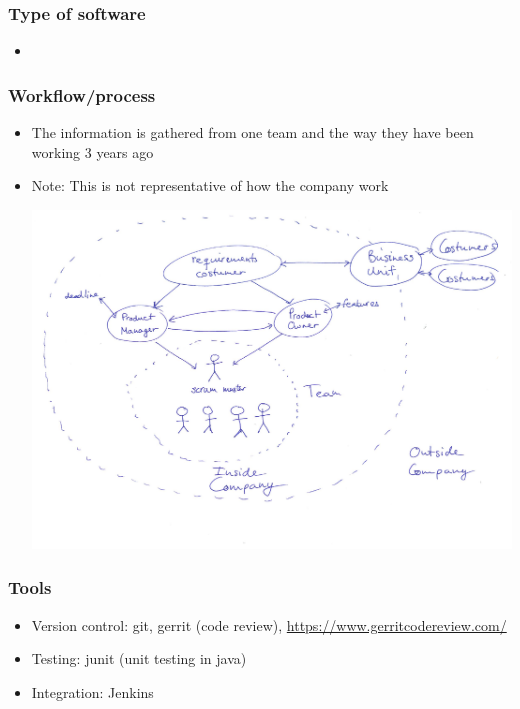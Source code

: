 \documentclass{beamer}
\begin{document}
\begin{frame}
  \frametitle{Type of software}
  \begin{itemize}
  \item
  \end{itemize}
\end{frame}

\begin{frame}
  \frametitle{Workflow/process}
  \begin{itemize}
  \item The information is gathered from one team and the way they have been working 3 years ago 
  \item Note: This is not representative of how the company work 
  \begin{center}
    \includegraphics[width=1\textwidth]{figs/scrum_setup.pdf}
  \end{center}
  \end{itemize}
  
\end{frame}

\begin{frame}
  \frametitle{Tools}
  \begin{itemize}
  \item Version control: git, gerrit (code review), \url{https://www.gerritcodereview.com/}
  \item Testing: junit (unit
    testing in java)
  \item Integration: Jenkins
  \end{itemize}
\end{frame}
\end{document}
